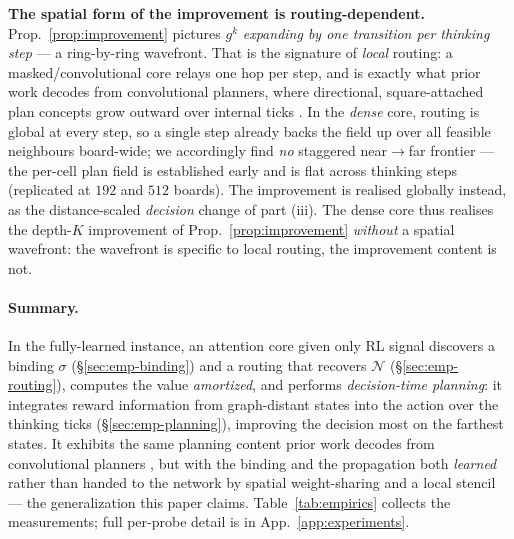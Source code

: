 \documentclass{article} %
\theoremstyle{plain}
\theoremstyle{definition}
\begin{document}
\textbf{The spatial form of the improvement is routing-dependent.}
Prop.~\ref{prop:improvement} pictures $g^{k}$ \emph{expanding by one transition
per thinking step} --- a ring-by-ring wavefront. That is the signature of
\emph{local} routing: a masked/convolutional core relays one hop per step, and is
exactly what prior work decodes from convolutional planners, where directional,
square-attached plan concepts grow outward over internal ticks
\citep{bush2025interpreting,taufeeque2024planning}. In the \emph{dense} core,
routing is global at every step, so a single step already backs the field up over
all feasible neighbours board-wide; we accordingly find \emph{no} staggered
near$\to$far frontier --- the per-cell plan field is established early and is flat
across thinking steps (replicated at $192$ and $512$ boards). The improvement is
realised globally instead, as the distance-scaled \emph{decision} change of part
(iii). The dense core thus realises the depth-$K$ improvement of
Prop.~\ref{prop:improvement} \emph{without} a spatial wavefront: the wavefront is
specific to local routing, the improvement content is not.

\paragraph{Summary.} In the fully-learned instance, an attention core given only
RL signal discovers a binding $\sigma$ (\S\ref{sec:emp-binding}) and a routing
that recovers $\mathcal{N}$ (\S\ref{sec:emp-routing}), computes the value
\emph{amortized}, and performs \emph{decision-time planning}: it integrates
reward information from graph-distant states into the action over the thinking
ticks (\S\ref{sec:emp-planning}), improving the decision most on the farthest
states. It
exhibits the same planning content prior work decodes from convolutional planners
\citep{guez2019investigation,bush2025interpreting,taufeeque2024planning}, but with
the binding and the propagation both \emph{learned} rather than handed to the
network by spatial weight-sharing and a local stencil --- the generalization this
paper claims. Table~\ref{tab:empirics} collects the measurements; full per-probe
detail is in App.~\ref{app:experiments}.
\end{document}
